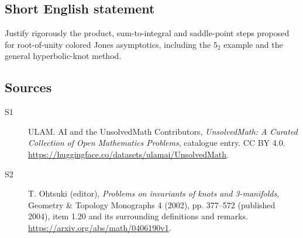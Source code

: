 \documentclass[11pt]{article}
\begin{document}
\subsection{Short English statement}
Justify rigorously the product, sum-to-integral and saddle-point steps proposed for root-of-unity colored Jones asymptotics, including the $5_2$ example and the general hyperbolic-knot method.
\subsection{Sources}
\begin{description}
\item[\hypertarget{source:statement:1}{S1}] ULAM. AI and the UnsolvedMath Contributors, \emph{UnsolvedMath: A Curated Collection of Open Mathematics Problems}, catalogue entry. CC BY 4.0. \url{https://huggingface.co/datasets/ulamai/UnsolvedMath}.
\item[\hypertarget{source:statement:2}{S2}] T. Ohtsuki (editor), \emph{Problems on invariants of knots and 3-manifolds}, Geometry \& Topology Monographs 4 (2002), pp. 377--572 (published 2004), item 1.20 and its surrounding definitions and remarks. \url{https://arxiv.org/abs/math/0406190v1}.
\end{description}
\label{end:statement}
\end{document}
